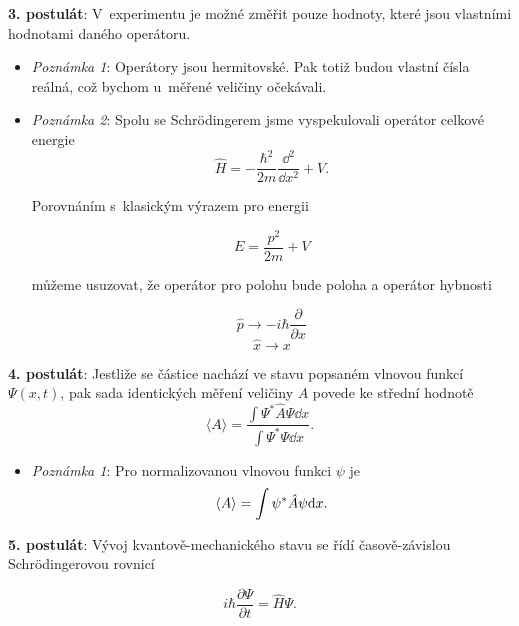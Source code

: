 {\bf 3. postulát}: V~experimentu je možné změřit pouze hodnoty, které jsou vlastními hodnotami daného operátoru.
\begin{itemize}
\item \textit{Poznámka 1}: Operátory jsou hermitovské. Pak totiž budou vlastní čísla reálná, což bychom u~měřené veličiny očekávali.
\item \textit{Poznámka 2}: Spolu se Schr\"odingerem jsme vyspekulovali operátor celkové energie
\begin{equation}
\hat{H} = - \frac{\hbar^2}{2m}\frac{\dd ^2}{\dd x^2} + V \mbox{.}
\label{rov:Postulaty1}
\end{equation}

\noindent Porovnáním s~klasickým výrazem pro energii

\begin{equation}
E = \frac{p^2}{2m} + V
\label{rov:Postulaty2}
\end{equation}

\noindent můžeme usuzovat, že operátor pro polohu bude poloha a operátor hybnosti

\begin{equation}
\boxed{\hat{p} \rightarrow - i\hbar \frac{\partial}{\partial x}}
\label{rov:Postulaty3}
\end{equation}
\begin{equation}
\boxed{\hat{x} \rightarrow   x}
\label{rov:Postulaty4}
\end{equation}
\end{itemize}

{\bf 4. postulát}: Jestliže se částice nachází ve stavu popsaném vlnovou funkcí $\Psi(x,t)$, pak sada identických měření veličiny $A$ povede ke střední hodnotě
\begin{equation}
\boxed{\langle A \rangle = \frac{\int \Psi^*\hat{A}\Psi \dd x}{\int \Psi^*\Psi \dd x}\mbox{.}}
\label{rov:Postulaty5}
\end{equation}
\begin{itemize}
\item \textit{Poznámka 1}: Pro normalizovanou vlnovou funkci $\psi$ je
\begin{equation}
\braket{A} = \int \psi^{\ast} \hat{A} \psi \mathrm{d} x.
\end{equation}
\end{itemize}

{\bf 5. postulát}: Vývoj kvantově-mechanického stavu se řídí časově-závislou Schr\"odingerovou rovnicí

\begin{equation}
\boxed{i\hbar \frac{\partial \Psi}{\partial t} = \hat{H}\Psi \mbox{.}}
\label{rov:Postulaty6}
\end{equation}


